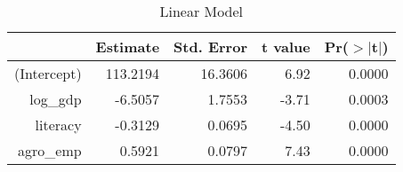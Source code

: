 \begin{table}[ht]
\centering
\begin{tabular}{rrrrr}
  \hline
 & Estimate & Std. Error & t value & Pr($>$$|$t$|$) \\ 
  \hline
(Intercept) & 113.2194 & 16.3606 & 6.92 & 0.0000 \\ 
  log\_gdp & -6.5057 & 1.7553 & -3.71 & 0.0003 \\ 
  literacy & -0.3129 & 0.0695 & -4.50 & 0.0000 \\ 
  agro\_emp & 0.5921 & 0.0797 & 7.43 & 0.0000 \\ 
   \hline
\end{tabular}
\caption{Linear Model} 
\label{tab:model_3}
\end{table}


